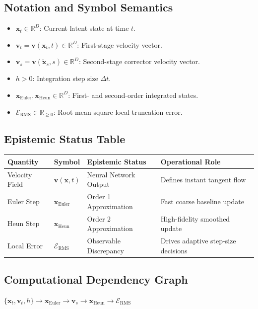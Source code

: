 \documentclass[11pt,a4paper]{article}
\theoremstyle{definition}
\begin{document}
\subsection{Notation and Symbol Semantics}
\begin{itemize}
    \item $\mathbf{x}_t \in \mathbb{R}^D$: Current latent state at time $t$.
    \item $\mathbf{v}_t = \mathbf{v}(\mathbf{x}_t, t) \in \mathbb{R}^D$: First-stage velocity vector.
    \item $\mathbf{v}_s = \mathbf{v}(\tilde{\mathbf{x}}_s, s) \in \mathbb{R}^D$: Second-stage corrector velocity vector.
    \item $h > 0$: Integration step size $\Delta t$.
    \item $\mathbf{x}_{\text{Euler}}, \mathbf{x}_{\text{Heun}} \in \mathbb{R}^D$: First- and second-order integrated states.
    \item $\mathcal{E}_{\text{RMS}} \in \mathbb{R}_{\ge 0}$: Root mean square local truncation error.
\end{itemize}

\subsection{Epistemic Status Table}
\begin{table}[h]
\centering
\small
\begin{tabular}{@{}llll@{}}
\toprule
\textbf{Quantity} & \textbf{Symbol} & \textbf{Epistemic Status} & \textbf{Operational Role} \\
\midrule
Velocity Field & $\mathbf{v}(\mathbf{x}, t)$ & Neural Network Output & Defines instant tangent flow \\
Euler Step & $\mathbf{x}_{\text{Euler}}$ & Order 1 Approximation & Fast coarse baseline update \\
Heun Step & $\mathbf{x}_{\text{Heun}}$ & Order 2 Approximation & High-fidelity smoothed update \\
Local Error & $\mathcal{E}_{\text{RMS}}$ & Observable Discrepancy & Drives adaptive step-size decisions \\
\bottomrule
\end{tabular}
\end{table}

\subsection{Computational Dependency Graph}
{\centering
$\{\mathbf{x}_t, \mathbf{v}_t, h\} \longrightarrow \mathbf{x}_{\text{Euler}} \longrightarrow \mathbf{v}_s \longrightarrow \mathbf{x}_{\text{Heun}} \longrightarrow \mathcal{E}_{\text{RMS}}$
\par}
\end{document}
